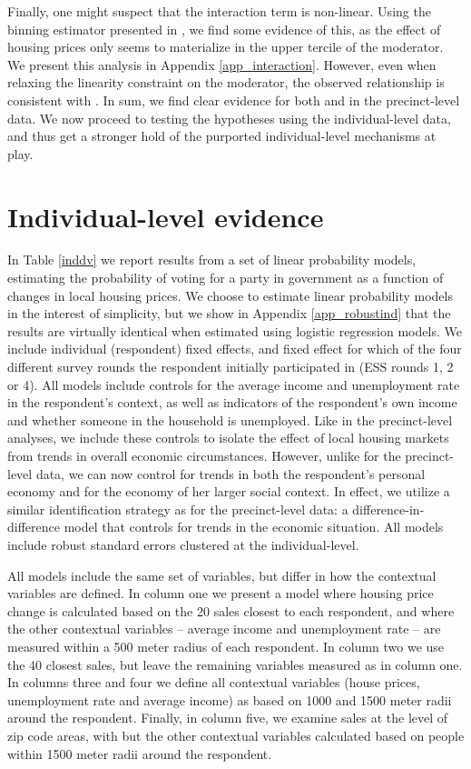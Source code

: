 \documentclass[12pt,a4paper]{article}
\begin{document}
	Finally, one might suspect that the interaction term is non-linear. Using the binning estimator presented in \cite{hainmueller2016much}, we find some evidence of this, as the effect of housing prices only seems to materialize in the upper tercile of the moderator. We present this analysis in Appendix \ref{app_interaction}. However, even when relaxing the linearity constraint on the moderator, the observed relationship is consistent with \htwo. 
	In sum, we find clear evidence for both \hone and \htwo in the precinct-level data. We now proceed to testing the hypotheses using the individual-level data, and thus get a stronger hold of the purported individual-level mechanisms at play.
	
	\section{Individual-level evidence}
	
	In Table \ref{inddv} we report results from a set of linear probability models, estimating the probability of voting for a party in government as a function of changes in local housing prices. We choose to estimate linear probability models in the interest of simplicity, but we show in Appendix \ref{app_robustind} that the results are virtually identical when estimated using logistic regression models. We include individual (respondent) fixed effects, and fixed effect for which of the four different survey rounds the respondent initially participated in (ESS rounds 1, 2 or 4). All models include controls for the average income and unemployment rate in the respondent's context, as well as indicators of the respondent's own income and whether someone in the household is unemployed. Like in the precinct-level analyses, we include these controls to isolate the effect of local housing markets from trends in overall economic circumstances. However, unlike for the precinct-level data, we can now control for trends in both the respondent’s personal economy and for the economy of her larger social context. In effect, we utilize a similar identification strategy as for the precinct-level data: a difference-in-difference model that controls for trends in the economic situation. All models include robust standard errors clustered at the individual-level.
	
	All models include the same set of variables, but differ in how the contextual variables are defined. In column one we present a model where housing price change is calculated based on the 20 sales closest to each respondent, and where the other contextual variables -- average income and unemployment rate -- are measured within a 500 meter radius of each respondent. In column two we use the 40 closest sales, but leave the remaining variables measured as in column one. In columns three and four we define all contextual variables (house prices, unemployment rate and average income) as based on 1000 and 1500 meter radii around the respondent. Finally, in column five, we examine sales at the level of zip code areas, with but the other contextual variables calculated based on people within 1500 meter radii around the respondent. 
	
\end{document}
